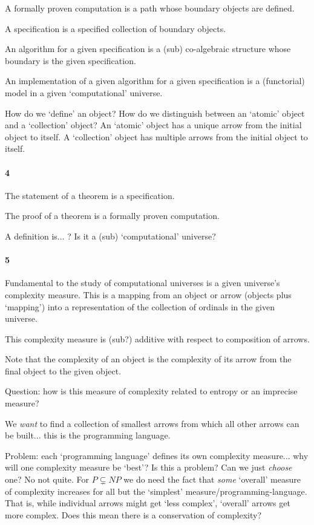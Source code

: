 A formally proven computation is a path whose boundary objects are defined.

A specification is a specified collection of boundary objects.

An algorithm for a given specification is a (sub) co-algebraic structure whose
boundary is the given specification.

An implementation of a given algorithm for a given specification is a
(functorial) model in a given `computational' universe.

How do we `define' an object? How do we distinguish between an `atomic' object
and a `collection' object? An `atomic' object has a unique arrow from the
initial object to itself. A `collection' object has multiple arrows from the
initial object to itself.

\paragraph{4}

The statement of a theorem is a specification.

The proof of a theorem is a formally proven computation.

A definition is... ? Is it a (sub) `computational' universe?

\paragraph{5}

Fundamental to the study of computational universes is a given universe's
complexity measure. This is a mapping from an object or arrow (objects plus
`mapping') into a representation of the collection of ordinals in the given
universe.

This complexity measure is (sub?) additive with respect to composition of
arrows.

Note that the complexity of an object is the complexity of its arrow from the
final object to the given object.

Question: how is this measure of complexity related to entropy or an imprecise
measure?

We \emph{want} to find a collection of smallest arrows from which all other
arrows can be built... this is the programming language.

Problem: each `programming language' defines its own complexity measure... why
will one complexity measure be `best'? Is this a problem? Can we just
\emph{choose} one? No not quite. For $P \subsetneq NP$ we do need the fact that
\emph{some} `overall' measure of complexity increases for all but the `simplest'
measure/programming-language. That is, while individual arrows might get `less
complex', `overall' arrows get more complex. Does this mean there is a
conservation of complexity?

